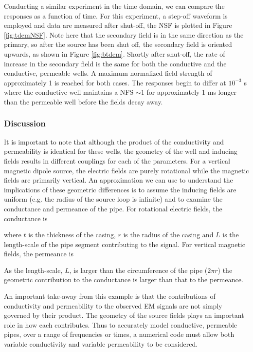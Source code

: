 





Conducting a similar experiment in the time domain, we can compare the responses as a function of time. For this experiment, a step-off waveform is employed and data are measured after shut-off, the NSF is plotted in Figure \ref{fig:tdemNSF}. Note here that the secondary field is in the same direction as the primary, so after the source has been shut off, the secondary field is oriented upwards, as shown in Figure \ref{fig:btdem}. Shortly after shut-off, the rate of increase in the secondary field is the same for both the conductive and the conductive, permeable wells. A maximum normalized field strength of approximately 1 is reached for both cases. The responses begin to differ at $10^{-3}$ s where the conductive well maintains a NFS $\sim 1$ for approximately 1 ms longer than the permeable well before the fields decay away.








\subsubsection{Discussion}

It is important to note that although the product of the conductivity and permeability is identical for these wells, the geometry of the well and inducing fields results in different couplings for each of the parameters. For a vertical magnetic dipole source, the electric fields are purely rotational while the magnetic fields are primarily vertical. An approximation we can use to understand the implications of these geometric differences is to assume the inducing fields are uniform (e.g. the radius of the source loop is infinite) and to examine the conductance and permeance of the pipe. For rotational electric fields, the conductance is

where $t$ is the thickness of the casing, $r$ is the radius of the casing and $L$ is the length-scale of the pipe segment contributing to the signal. For vertical magnetic fields, the permeance is

As the length-scale, $L$, is larger than the circumference of the pipe ($2\pi r$) the geometric contribution to the conductance is larger than that to the permeance.

An important take-away from this example is that the contributions of conductivity and permeability to the observed EM signals are not simply governed by their product. The geometry of the source fields plays an important role in how each contributes. Thus to accurately model conductive, permeable pipes, over a range of frequencies or times, a numerical code must allow both variable conductivity and variable permeability to be considered.

